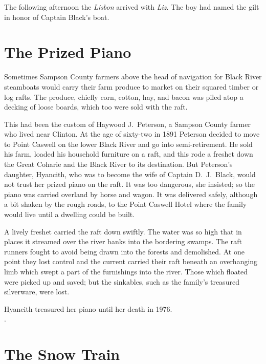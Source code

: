 \documentclass[11pt, a5paper, openright]{book}
\begin{document}
The following afternoon the \textit{Lisbon} arrived with \textit{Liz}.
The boy had named the gilt in honor of
Captain Black's boat.  \citep{johnsonwc}\par

\section{The Prized Piano}

Sometimes Sampson County farmers above the head of navigation for
Black River steamboats would carry their farm produce to market on
their squared timber or log rafts.  The produce, chiefly corn, cotton,
hay, and bacon was piled atop a decking of loose boards, which too
were sold with the raft.\par

This had been the custom of Haywood J.\ Peterson, a Sampson County
farmer who lived near Clinton.  At the age of sixty-two in 1891
Peterson decided to move to Point Caswell on the lower Black River and
go into semi-retirement.  He sold his farm, loaded his household
furniture on a raft, and this rode a freshet down the Great Coharie
and the Black River to its destination.  But Peterson's daughter,
Hyancith, who was to become the wife of Captain
D.~J.\ Black, would not trust her prized
piano on the raft.  It was too dangerous, she insisted; so the piano
was carried overland by horse and wagon.  It was delivered safely,
although a bit shaken by the rough roads, to the Point Caswell Hotel
where the family would live until a dwelling could be built.\par

A lively freshet carried the raft down swiftly.  The water was so high
that in places it streamed over the river banks into the bordering
swamps.  The raft runners fought to avoid being drawn into the forests
and demolished.  At one point they lost control and the current
carried their raft beneath an overhanging limb which swept a part of
the furnishings into the river.  Those which floated were picked up
and saved; but the sinkables, such as the family's treasured
silverware, were lost.\par

Hyancith treasured her piano until her death in 1976.\\
\citep{shumpertsb}.\par

\section{The Snow Train}
\end{document}
